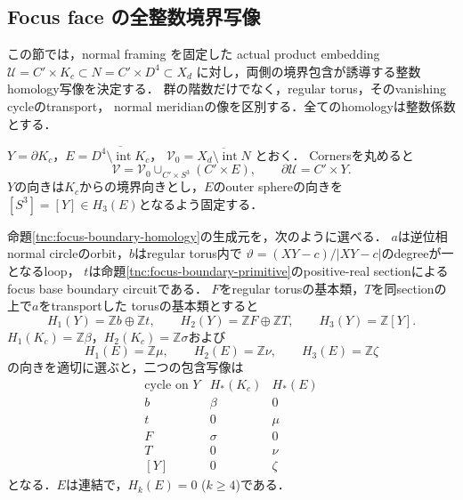 \subsection{Focus face の全整数境界写像}
\label{tnc:boundary-maps-section}

この節では，normal framing を固定した actual product embedding
$\mathcal U=C'\times K_c\subset N=C'\times D^4\subset X_d$
に対し，両側の境界包含が誘導する整数homology写像を決定する．
群の階数だけでなく，regular torus，そのvanishing cycleのtransport，
normal meridianの像を区別する．全てのhomologyは整数係数とする．

$Y=\partial K_c$，$E=\overline{D^4\setminus\operatorname{int}K_c}$，
$\mathcal V_0=\overline{X_d\setminus\operatorname{int}N}$ とおく．
Cornersを丸めると
\[
 \mathcal V=\mathcal V_0\cup_{C'\times S^3}(C'\times E),
 \qquad \partial\mathcal U=C'\times Y.
\]
$Y$の向きは$K_c$からの境界向きとし，$E$のouter sphereの向きを
$[S^3]=[Y]\in H_3(E)$となるよう固定する．

\begin{lemma}
\label{tnc:normal-boundary-maps}
命題\ref{tnc:focus-boundary-homology}の生成元を，次のように選べる．
$a$は逆位相normal circleのorbit，$b$はregular torus内で
$\vartheta=(XY-c)/|XY-c|$のdegreeが一となるloop，
$t$は命題\ref{tnc:focus-boundary-primitive}のpositive-real sectionによる
focus base boundary circuitである．
$F$をregular torusの基本類，$T$を同sectionの上で$a$をtransportした
torusの基本類とすると
\[
 H_1(Y)=\mathbb Z b\oplus\mathbb Z t,
 \qquad H_2(Y)=\mathbb Z F\oplus\mathbb Z T,
 \qquad H_3(Y)=\mathbb Z[Y].
\]
$H_1(K_c)=\mathbb Z\beta$，$H_2(K_c)=\mathbb Z\sigma$および
\[
 H_1(E)=\mathbb Z\mu,\qquad H_2(E)=\mathbb Z\nu,
 \qquad H_3(E)=\mathbb Z\zeta
\]
の向きを適切に選ぶと，二つの包含写像は
\[
\begin{array}{c|cc}
 \text{cycle on }Y & H_*(K_c)&H_*(E)\\ \hline
 b&\beta&0\\
 t&0&\mu\\
 F&\sigma&0\\
 T&0&\nu\\
 {[Y]}&0&\zeta
\end{array}
\]
となる．$E$は連結で，$H_k(E)=0$ ($k\ge4$)である．
\end{lemma}

